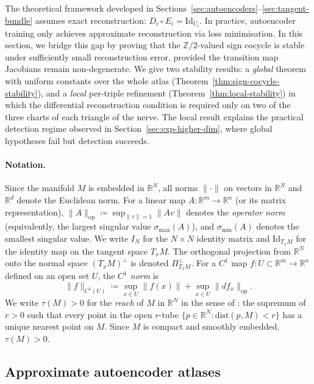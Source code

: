 \documentclass[11pt]{article}
\newcommand{\R}{\mathbb{R}}
\newcommand{\Z}{\mathbb{Z}}
\newcommand{\Id}{\mathrm{Id}}
\theoremstyle{plain}
\theoremstyle{definition}
\theoremstyle{remark}
\begin{document}
The theoretical framework developed in Sections~\ref{sec:autoencoders}--\ref{sec:tangent-bundle} assumes exact reconstruction: $D_i \circ E_i = \Id_{U_i}$. In practice, autoencoder training only achieves approximate reconstruction via loss minimisation. In this section, we bridge this gap by proving that the $\Z/2$-valued sign cocycle is stable under sufficiently small reconstruction error, provided the transition map Jacobians remain non-degenerate. We give two stability results: a \emph{global} theorem with uniform constants over the whole atlas (Theorem~\ref{thm:sign-cocycle-stability}), and a \emph{local} per-triple refinement (Theorem~\ref{thm:local-stability}) in which the differential reconstruction condition is required only on two of the three charts of each triangle of the nerve. The local result explains the practical detection regime observed in Section~\ref{sec:exp-higher-dim}, where global hypotheses fail but detection succeeds.

\paragraph{Notation.}
Since the manifold $M$ is embedded in $\R^N$, all norms $\|\cdot\|$ on vectors in $\R^N$ and $\R^d$ denote the Euclidean norm. For a linear map $A \colon \R^m \to \R^n$ (or its matrix representation), $\|A\|_{\mathrm{op}} \coloneqq \sup_{\|v\| = 1} \|Av\|$ denotes the \emph{operator norm} (equivalently, the largest singular value $\sigma_{\max}(A)$), and $\sigma_{\min}(A)$ denotes the smallest singular value. We write $I_N$ for the $N \times N$ identity matrix and $\Id_{T_xM}$ for the identity map on the tangent space $T_xM$. The orthogonal projection from $\R^N$ onto the normal space $(T_xM)^\perp$ is denoted $\Pi_{T_xM}^\perp$. For a $C^1$ map $f : U \subset \R^m \to \R^n$ defined on an open set $U$, the \emph{$C^1$ norm} is
\[
\|f\|_{C^1(U)} \coloneqq \sup_{x \in U} \|f(x)\| + \sup_{x \in U} \|df_x\|_{\mathrm{op}}.
\]
We write $\tau(M) > 0$ for the \emph{reach} of $M$ in $\R^N$ in the sense of \cite{Niyogi2008}: the supremum of $r > 0$ such that every point in the open $r$-tube $\{p \in \R^N : \mathrm{dist}(p, M) < r\}$ has a unique nearest point on $M$. Since $M$ is compact and smoothly embedded, $\tau(M) > 0$.

\subsection{Approximate autoencoder atlases}\label{sec:approximateautoencoders}
\end{document}
